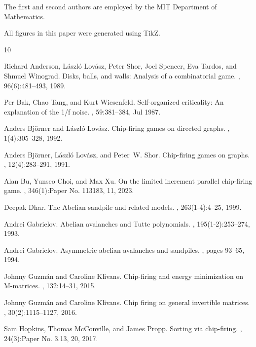 \documentclass[11pt]{article}
\theoremstyle{definition}
\theoremstyle{remark}
\begin{document}
The first and second authors are employed by the MIT Department of Mathematics.

All figures in this paper were generated using TikZ.


\begin{thebibliography}{10}

Richard Anderson, L{\'a}szl{\'o} Lov{\'a}sz, Peter Shor, Joel Spencer, Eva Tardos, and Shmuel Winograd.
\newblock Disks, balls, and walls: {Analysis} of a combinatorial game.
, 96(6):481--493, 1989.

Per Bak, Chao Tang, and Kurt Wiesenfeld.
\newblock Self-organized criticality: An explanation of the 1/f noise.
, 59:381--384, Jul 1987.

Anders Bj\"orner and L\'aszl\'o Lov\'asz.
\newblock Chip-firing games on directed graphs.
, 1(4):305--328, 1992.

Anders Bj\"orner, L\'aszl\'o{} Lov\'asz, and Peter~W. Shor.
\newblock Chip-firing games on graphs.
, 12(4):283--291, 1991.

Alan Bu, Yunseo Choi, and Max Xu.
\newblock On the limited increment parallel chip-firing game.
, 346(1):Paper No. 113183, 11, 2023.

Deepak Dhar.
\newblock The {A}belian sandpile and related models.
, 263(1-4):4--25, 1999.

Andrei Gabrielov.
\newblock Abelian avalanches and {T}utte polynomials.
, 195(1-2):253--274, 1993.

Andrei Gabrielov.
\newblock Asymmetric abelian avalanches and sandpiles.
, pages 93--65, 1994.

Johnny Guzm\'an and Caroline Klivans.
\newblock Chip-firing and energy minimization on {M}-matrices.
, 132:14--31, 2015.

Johnny Guzm\'an and Caroline Klivans.
\newblock Chip firing on general invertible matrices.
, 30(2):1115--1127, 2016.

Sam Hopkins, Thomas McConville, and James Propp.
\newblock Sorting via chip-firing.
, 24(3):Paper No. 3.13, 20, 2017.


\end{thebibliography}
\end{document}
